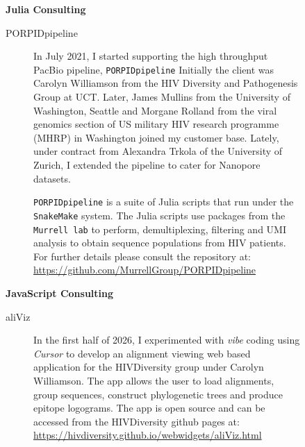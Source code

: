 \begin{description}\item[] \begin{description}\item[] {\large \bf  Julia Consulting }
\begin{description}
 \item[ PORPIDpipeline   ]  In July 2021, I started supporting the high throughput PacBio pipeline, {\tt PORPIDpipeline}
 Initially the client was Carolyn Williamson from the HIV Diversity and Pathogenesis Group at UCT. 
 Later, James Mullins from the University of Washington, Seattle 
 and Morgane Rolland from the viral genomics section of US military HIV research programme (MHRP) in Washington
 joined my customer base. Lately, under contract from Alexandra Trkola of the University of Zurich, I extended the pipeline
 to cater for Nanopore datasets.
 
 {\tt PORPIDpipeline} is a suite of Julia scripts that run under the {\tt SnakeMake} system. The Julia scripts use packages 
 from the {\tt Murrell lab} to perform, demultiplexing, filtering and UMI analysis to obtain sequence populations from HIV 
 patients. For further details please consult the repository at: \url{https://github.com/MurrellGroup/PORPIDpipeline}
 
\end{description}
\end{description}
\end{description}

\begin{description}\item[] \begin{description}\item[] {\large \bf  JavaScript Consulting }
\begin{description}
 \item[ aliViz  ]  In the first half of 2026, I experimented with {\it vibe} coding using {\it Cursor} to develop an
 alignment viewing web based application for the HIVDiversity group under Carolyn Williamson. The app allows
 the user to load alignments, group sequences, construct phylogenetic trees and produce epitope logograms.
 The app is open source and can be accessed from the HIVDiversity github pages at: \url{https://hivdiversity.github.io/webwidgets/aliViz.html}
 
\end{description}
\end{description}
\end{description}




\label{f0}
